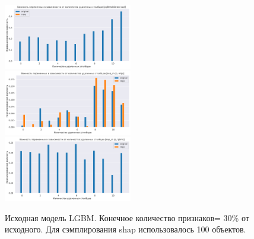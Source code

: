 \documentclass[12pt]{article}
\begin{document}
\begin{figure}[h]
        \includegraphics[width=0.5\textwidth]{images/art1_original_copy_lgbm_pyBreakDown (up).pdf}
        \includegraphics[width=0.5\textwidth]{images/art1_original_copy_lgbm_exp_m (p, mlp).pdf}
        \includegraphics[width=0.5\textwidth]{images/art1_original_copy_lgbm_exp_m (p, lgbm).pdf}
\caption{\centering Исходная модель LGBM. Конечное количество признаков= 30\% от исходного. Для сэмплирования shap использовалось 100 объектов.}
\end{figure}
\end{document}
